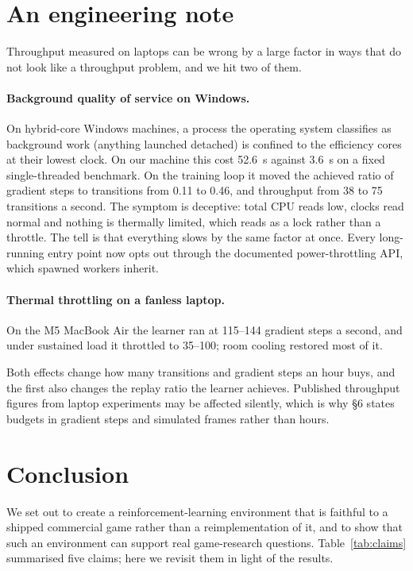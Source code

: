 \documentclass[11pt]{article}
\begin{document}
\section{An engineering note}

Throughput measured on laptops can be wrong by a large factor in ways that do not look like a throughput problem, and we hit two of them.

\paragraph{Background quality of service on Windows.} On hybrid-core Windows machines, a process the operating system classifies as background work (anything launched detached) is confined to the efficiency cores at their lowest clock. On our machine this cost 52.6~s against 3.6~s on a fixed single-threaded benchmark. On the training loop it moved the achieved ratio of gradient steps to transitions from 0.11 to 0.46, and throughput from 38 to 75 transitions a second. The symptom is deceptive: total CPU reads low, clocks read normal and nothing is thermally limited, which reads as a lock rather than a throttle. The tell is that everything slows by the same factor at once. Every long-running entry point now opts out through the documented power-throttling API, which spawned workers inherit.

\paragraph{Thermal throttling on a fanless laptop.} On the M5 MacBook Air the learner ran at 115--144 gradient steps a second, and under sustained load it throttled to 35--100; room cooling restored most of it.

Both effects change how many transitions and gradient steps an hour buys, and the first also changes the replay ratio the learner achieves. Published throughput figures from laptop experiments may be affected silently, which is why \S6 states budgets in gradient steps and simulated frames rather than hours.

\section{Conclusion}

We set out to create a reinforcement-learning environment that is faithful to a shipped commercial game rather than a reimplementation of it, and to show that such an environment can support real game-research questions. Table~\ref{tab:claims} summarised five claims; here we revisit them in light of the results.
\end{document}
